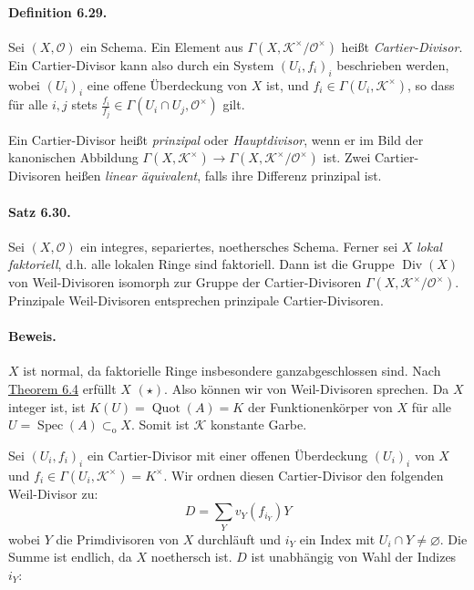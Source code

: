 \paragraph{Definition 6.29.}\label{6.29} Sei $(X,\mathcal{O})$ ein Schema. Ein Element aus $\Gamma(X,\mathcal{K}^\times/\mathcal{O}^\times)$ heißt \textit{Cartier-Divisor}. Ein Cartier-Divisor kann also durch ein System $(U_i,f_i)_i$ beschrieben werden, wobei $(U_i)_i$ eine offene Überdeckung von $X$ ist, und $f_i\in\Gamma(U_i,\mathcal{K}^\times)$, so dass für alle $i,j$ stets $\frac{f_i}{f_j}\in\Gamma(U_i\cap U_j,\mathcal{O}^\times)$ gilt.

Ein Cartier-Divisor heißt \textit{prinzipal} oder \textit{Hauptdivisor}, wenn er im Bild der kanonischen Abbildung $\Gamma(X,\mathcal{K}^\times)\to\Gamma(X,\mathcal{K}^\times/\mathcal{O}^\times)$ ist. Zwei Cartier-Divisoren heißen \textit{linear äquivalent}, falls ihre Differenz prinzipal ist.

\paragraph{Satz 6.30.}\label{6.30} Sei $(X,\mathcal{O})$ ein integres, separiertes, noethersches Schema. Ferner sei $X$ \textit{lokal faktoriell}, d.h. alle lokalen Ringe sind faktoriell. Dann ist die Gruppe $\operatorname{Div}(X)$ von Weil-Divisoren isomorph zur Gruppe der Cartier-Divisoren $\Gamma(X,\mathcal{K}^\times/\mathcal{O}^\times)$. Prinzipale Weil-Divisoren entsprechen prinzipale Cartier-Divisoren.

\paragraph{Beweis.} $X$ ist normal, da faktorielle Ringe insbesondere ganzabgeschlossen sind. Nach \hyperref[6.4]{Theorem 6.4} erfüllt $X$ $(\star)$. Also können wir von Weil-Divisoren sprechen. Da $X$ integer ist, ist $K(U)=\operatorname{Quot}(A)= K$ der Funktionenkörper von $X$ für alle $U=\operatorname{Spec}(A)\subset_\text{o}X$. Somit ist $\mathcal{K}$ konstante Garbe.

Sei $(U_i,f_i)_i$ ein Cartier-Divisor mit einer offenen Überdeckung $(U_i)_i$ von $X$ und $f_i\in\Gamma(U_i,\mathcal{K}^\times)=K^\times$. Wir ordnen diesen Cartier-Divisor den folgenden Weil-Divisor zu:
\[D=\sum_Y v_Y(f_{i_Y})Y \]
wobei $Y$ die Primdivisoren von $X$ durchläuft und $i_Y$ ein Index mit $U_i\cap Y\neq\varnothing$. Die Summe ist endlich, da $X$ noethersch ist. $D$ ist unabhängig von Wahl der Indizes $i_Y$:

